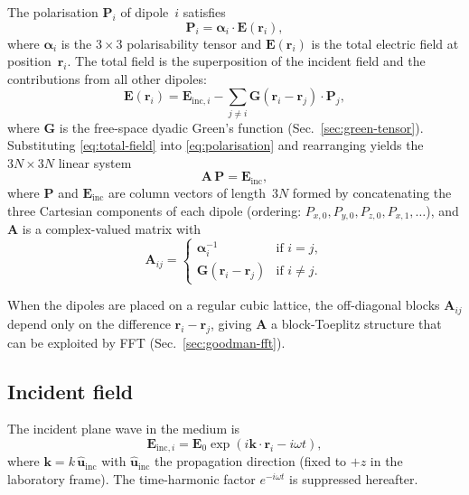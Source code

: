 \documentclass[11pt,a4paper]{article}
\begin{document}
The polarisation $\bm{P}_i$ of dipole~$i$ satisfies
\begin{equation}
  \bm{P}_i = \boldsymbol{\alpha}_i \cdot \bm{E}(\bm{r}_i),
  \label{eq:polarisation}
\end{equation}
where $\boldsymbol{\alpha}_i$ is the $3\times 3$ polarisability tensor and
$\bm{E}(\bm{r}_i)$ is the total electric field at position~$\bm{r}_i$.
The total field is the superposition of the incident field and the
contributions from all other dipoles:
\begin{equation}
  \bm{E}(\bm{r}_i)
    = \bm{E}_{\text{inc},i}
      - \sum_{j \neq i} \mathbf{G}(\bm{r}_i - \bm{r}_j) \cdot \bm{P}_j,
  \label{eq:total-field}
\end{equation}
where $\mathbf{G}$ is the free-space dyadic Green's function
(Sec.~\ref{sec:green-tensor}).
Substituting \eqref{eq:total-field} into \eqref{eq:polarisation} and
rearranging yields the $3N \times 3N$ linear system
\begin{equation}
  \mathbf{A} \, \bm{P} = \bm{E}_{\text{inc}},
  \label{eq:dda-system}
\end{equation}
where $\bm{P}$ and $\bm{E}_{\text{inc}}$ are column vectors of length~$3N$
formed by concatenating the three Cartesian components of each dipole
(ordering: $P_{x,0}, P_{y,0}, P_{z,0}, P_{x,1}, \ldots$),
and $\mathbf{A}$ is a complex-valued matrix with
\begin{equation}
  \mathbf{A}_{ij} =
  \begin{cases}
    \boldsymbol{\alpha}_i^{-1}         & \text{if } i = j, \\[4pt]
    \mathbf{G}(\bm{r}_i - \bm{r}_j)   & \text{if } i \neq j.
  \end{cases}
  \label{eq:A-matrix}
\end{equation}

When the dipoles are placed on a regular cubic lattice, the off-diagonal
blocks $\mathbf{A}_{ij}$ depend only on the difference $\bm{r}_i - \bm{r}_j$,
giving $\mathbf{A}$ a block-Toeplitz structure that can be exploited by FFT
(Sec.~\ref{sec:goodman-fft}).

\subsection{Incident field}
\label{sec:incident-field}

The incident plane wave in the medium is
\begin{equation}
  \bm{E}_{\text{inc},i}
    = \bm{E}_0 \exp(i \bm{k} \cdot \bm{r}_i - i\omega t),
  \label{eq:incident-wave}
\end{equation}
where $\bm{k} = k\,\hat{\bm{u}}_{\text{inc}}$ with
$\hat{\bm{u}}_{\text{inc}}$ the propagation direction
(fixed to $+z$ in the laboratory frame).
The time-harmonic factor $e^{-i\omega t}$ is suppressed hereafter.
\end{document}
